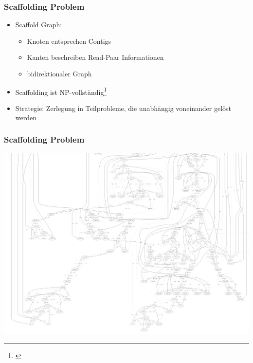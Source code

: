 \documentclass[xcolor=pst]{beamer}
\begin{document}

\begin{frame}
  \frametitle{Scaffolding Problem}
  \begin{itemize}
  \item Scaffold Graph:
    \begin{itemize}
    \item Knoten entsprechen Contigs
    \item Kanten beschreiben Read-Paar
      Informationen
    \item bidirektionaler Graph
    \end{itemize}
  \item Scaffolding ist NP-vollständig\footnote{\cite{Huson:2002kf}}
  \item Strategie: Zerlegung in %
    Teilprobleme, die unabhängig voneinander gelöst werden
  \end{itemize}
\end{frame}

\begin{frame}
  \frametitle{Scaffolding Problem}
  \begin{center}
    \includegraphics[width=\textwidth,height=\textheight,keepaspectratio]{figures/Scaffolding_graph.png}
  \end{center}
\end{frame}
\end{document}
